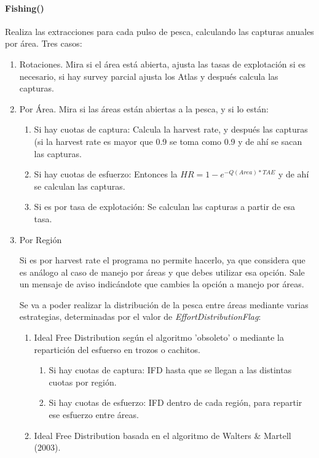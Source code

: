 			\paragraph{Fishing()}
				Realiza las extracciones para cada pulso de pesca, calculando las capturas anuales por área. 
				Tres casos:
				\begin{enumerate}
					\item Rotaciones. Mira si el área está abierta, ajusta las tasas de explotación si es necesario, si hay survey parcial ajusta los Atlas y después calcula las capturas. 
					\item Por Área. Mira si las áreas están abiertas a la pesca, y si lo están:
						\begin{enumerate}
							\item Si hay cuotas de captura: Calcula la harvest rate, y después las capturas (si la harvest rate es mayor que 0.9 se toma como 0.9 y de ahí se sacan las capturas. 
							\item Si hay cuotas de esfuerzo: Entonces la $HR=1-e^{-Q(Area)*TAE}$ y de ahí se calculan las capturas.
							\item Si es por tasa de explotación: Se calculan las capturas a partir de esa tasa. 
						\end{enumerate}
					\item Por Región
					 \par Si es por harvest rate el programa no permite hacerlo, ya que considera que es análogo al caso de manejo por áreas y que debes utilizar esa opción. Sale un mensaje de aviso indicándote que cambies la opción a manejo por áreas.
					\par Se va a poder realizar la distribución de la pesca entre áreas mediante varias estrategias, determinadas por el valor de \emph{EffortDistributionFlag}:
					\begin{enumerate}
						\item Ideal Free Distribution según el algoritmo 'obsoleto' o mediante la repartición del esfuerso en trozos o cachitos. 
						\begin{enumerate}
							\item Si hay cuotas de captura: IFD hasta que se llegan a las distintas cuotas por región.
							\item Si hay cuotas de esfuerzo: IFD dentro de cada región, para repartir ese esfuerzo entre áreas. 	 
						\end{enumerate}
						\item Ideal Free Distribution basada en el algoritmo de Walters \& Martell (2003). 

\end{enumerate}
\end{enumerate}
